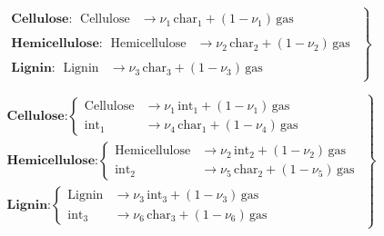 \documentclass{article}
\begin{document}
\begin{equation}
\label{eq:UCB1}
\left.
\begin{aligned}
&\textbf{Cellulose:}
\begin{aligned}
\mathrm{~Cellulose}
&\rightarrow
\nu_1\,\mathrm{char}_1
+
(1-\nu_1)\,\mathrm{gas}
\end{aligned}
\\[8pt]
&\textbf{Hemicellulose:}
\begin{aligned}
\mathrm{~Hemicellulose}
&\rightarrow
\nu_2\,\mathrm{char}_2
+
(1-\nu_2)\,\mathrm{gas}
\end{aligned}
\\[8pt]
&\textbf{Lignin:}
\begin{aligned}
\mathrm{~Lignin}
&\rightarrow
\nu_3\,\mathrm{char}_3
+
(1-\nu_3)\,\mathrm{gas}
\end{aligned}
\end{aligned}
\right\}
\end{equation}

\begin{equation}
\label{eq:UCB2}
\left.
\begin{aligned}
&\textbf{Cellulose:}
\left\{
\begin{aligned}
\mathrm{Cellulose}
&\rightarrow
\nu_1\,\mathrm{int}_1
+
(1-\nu_1)\,\mathrm{gas}
\\
\mathrm{int}_1
&\rightarrow
\nu_4\,\mathrm{char}_1
+
(1-\nu_4)\,\mathrm{gas}
\end{aligned}
\right.
\\[12pt]
&\textbf{Hemicellulose:}
\left\{
\begin{aligned}
\mathrm{Hemicellulose}
&\rightarrow
\nu_2\,\mathrm{int}_2
+
(1-\nu_2)\,\mathrm{gas}
\\
\mathrm{int}_2
&\rightarrow
\nu_5\,\mathrm{char}_2
+
(1-\nu_5)\,\mathrm{gas}
\end{aligned}
\right.
\\[12pt]
&\textbf{Lignin:}
\left\{
\begin{aligned}
\mathrm{Lignin}
&\rightarrow
\nu_3\,\mathrm{int}_3
+
(1-\nu_3)\,\mathrm{gas}
\\
\mathrm{int}_3
&\rightarrow
\nu_6\,\mathrm{char}_3
+
(1-\nu_6)\,\mathrm{gas}
\end{aligned}
\right.
\end{aligned}
\right\}
\end{equation}
\end{document}
